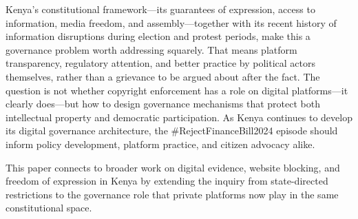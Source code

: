 \documentclass{article}
\begin{document}
Kenya's constitutional framework—its guarantees of expression, access to information, media freedom, and assembly—together with its recent history of information disruptions during election and protest periods, make this a governance problem worth addressing squarely. That means platform transparency, regulatory attention, and better practice by political actors themselves, rather than a grievance to be argued about after the fact. The question is not whether copyright enforcement has a role on digital platforms—it clearly does—but how to design governance mechanisms that protect both intellectual property and democratic participation. As Kenya continues to develop its digital governance architecture, the \#RejectFinanceBill2024 episode should inform policy development, platform practice, and citizen advocacy alike.

This paper connects to broader work on digital evidence, website blocking, and freedom of expression in Kenya by extending the inquiry from state-directed restrictions to the governance role that private platforms now play in the same constitutional space.

\printbibliography
\end{document}
